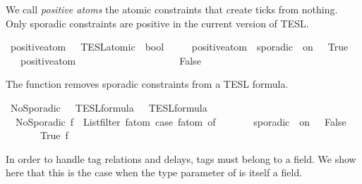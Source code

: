 \begin{isabellebody}
\begin{isamarkuptext}%
We call \emph{positive atoms} the atomic constraints that create ticks from nothing.
  Only sporadic constraints are positive in the current version of TESL.%
\end{isamarkuptext}\isamarkuptrue%
\isamarkupfalse%
\ positive{\isacharunderscore}atom\ {\isacharcolon}{\isacharcolon}\ {\isacartoucheopen}{\isacharprime}{\isasymtau}\ TESL{\isacharunderscore}atomic\ {\isasymRightarrow}\ bool{\isacartoucheclose}\ \isanewline
\ \ \ \ {\isacartoucheopen}positive{\isacharunderscore}atom\ {\isacharparenleft}{\isacharunderscore}\ sporadic\ {\isacharunderscore}\ on\ {\isacharunderscore}{\isacharparenright}\ {\isacharequal}\ True{\isacartoucheclose}\isanewline
\ \ {\isacharbar}\ {\isacartoucheopen}positive{\isacharunderscore}atom\ {\isacharunderscore}\ \ \ \ \ \ \ \ \ \ \ \ \ \ \ \ \ \ \ {\isacharequal}\ False{\isacartoucheclose}%
\begin{isamarkuptext}%
The  function removes sporadic constraints from a TESL formula.%
\end{isamarkuptext}\isamarkuptrue%
\isamarkupfalse%
\ NoSporadic\ {\isacharcolon}{\isacharcolon}\ {\isacartoucheopen}{\isacharprime}{\isasymtau}\ TESL{\isacharunderscore}formula\ {\isasymRightarrow}\ {\isacharprime}{\isasymtau}\ TESL{\isacharunderscore}formula{\isacartoucheclose}\isanewline
{}\ \isanewline
\ \ {\isacartoucheopen}NoSporadic\ f\ {\isasymequiv}\ {\isacharparenleft}List{\isachardot}filter\ {\isacharparenleft}{\isasymlambda}f\isactrlsub a\isactrlsub t\isactrlsub o\isactrlsub m{\isachardot}\ case\ f\isactrlsub a\isactrlsub t\isactrlsub o\isactrlsub m\ of\isanewline
\ \ \ \ \ \ {\isacharunderscore}\ sporadic\ {\isacharunderscore}\ on\ {\isacharunderscore}\ {\isasymRightarrow}\ False\isanewline
\ \ \ \ {\isacharbar}\ {\isacharunderscore}\ {\isasymRightarrow}\ True{\isacharparenright}\ f{\isacharparenright}{\isacartoucheclose}%
\isadelimdocument
%
\endisadelimdocument
%
\isatagdocument
%
\isamarkuptrue%
%
\endisatagdocument
{\isafolddocument}%
%
\isadelimdocument
%
\endisadelimdocument
%
\begin{isamarkuptext}%
In order to handle tag relations and delays, tags must belong to a field.
  We show here that this is the case when the type parameter of  
  is itself a field.%
\end{isamarkuptext}\isamarkuptrue%

\end{isabellebody}
